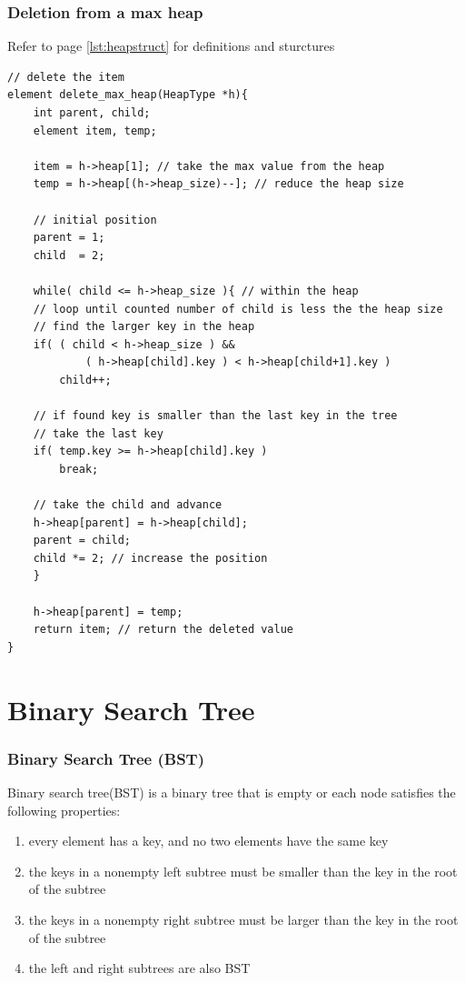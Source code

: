 \documentclass[newPxFont,sthlmFooter,nooffset]{beamer}
\begin{document}
\begin{frame}
  \frametitle{Deletion from a max heap}

Refer to page \ref{lst:heapstruct} for definitions and sturctures
  \begin{lstlisting}
// delete the item
element delete_max_heap(HeapType *h){
    int parent, child;
    element item, temp;

    item = h->heap[1]; // take the max value from the heap
    temp = h->heap[(h->heap_size)--]; // reduce the heap size

    // initial position
    parent = 1;
    child  = 2;

    while( child <= h->heap_size ){ // within the heap
	// loop until counted number of child is less the the heap size
	// find the larger key in the heap
	if( ( child < h->heap_size ) &&
            ( h->heap[child].key ) < h->heap[child+1].key )
		child++;

	// if found key is smaller than the last key in the tree 
	// take the last key
	if( temp.key >= h->heap[child].key )
		break;

	// take the child and advance
	h->heap[parent] = h->heap[child];
	parent = child;
	child *= 2; // increase the position
    }

    h->heap[parent] = temp;
    return item; // return the deleted value
}    
  \end{lstlisting}
\end{frame}

\section{Binary Search Tree}
\begin{frame}[t]
  \frametitle{Binary Search Tree (BST)}
Binary search tree(BST) is a binary tree that is empty or each
node satisfies the following properties:
\begin{enumerate}
\item every element has a key, and no two elements have the same key
\item the keys in a nonempty left subtree must be smaller than the key
  in the root of the subtree
\item the keys in a nonempty right subtree
  must be larger than the key in the root of the subtree
\item the left and right subtrees are also BST
\end{enumerate}

\end{frame}
\end{document}
